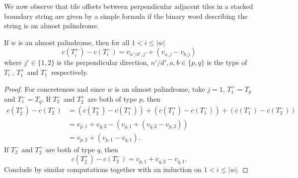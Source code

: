 \documentclass[12pt]{amsart}
\begin{document}
We now observe that tile offsets between perpendicular adjacent tiles in a stacked boundary string
are given by a simple formula if the binary word describing the string is an almost palindrome. 
\begin{lemma} \label{lemma:almost_palindrome_offset}
	If $w$ is an almost palindrome, then for all $1 < i \leq |w|$
	\[
	c(T_i^{+}) - c(T_i^{-}) = v_{n'/d', j'} +  (v_{a,j} - v_{b,j})
	\]
	where $j' \in \{1,2\}$ is the perpendicular direction, $n'/d', a,b \in \{p,q\}$ is the type of $T_i^-$,
	$T_1^+$ and $T_1^-$ respectively.  
\end{lemma}
\begin{proof}
	For concreteness and since $w$ is an almost palindrome, take $j = 1$, $T_1^+ = T_p$ and $T_1^- = T_q$.
	If $T_2^-$ and $T_2^+$ are both of type $p$, then 
	\begin{align*}
	c(T_2^+) - c(T_2^-) &=	(c(T_2^+) - c(T_1^+)) + (c(T_1^+) - c(T_1^-)) + (c(T_1^-) - c(T_2^-)) \\
	&= v_{p,1} + v_{q,2} - (v_{q,1} + (v_{q,2} - v_{p,2})) \\
	&= v_{p,2} +  (v_{p,1} - v_{q,1}).
	\end{align*}
	If $T_2^-$ and $T_2^+$ are both of type $q$, then 
	\[
	c(T_2^+) - c(T_2^-) = v_{p,1} + v_{q,2} - v_{q,1}.
	\]
	Conclude by similar computations together with an induction on $1 < i \leq |w|$. 

\end{proof}
\end{document}
